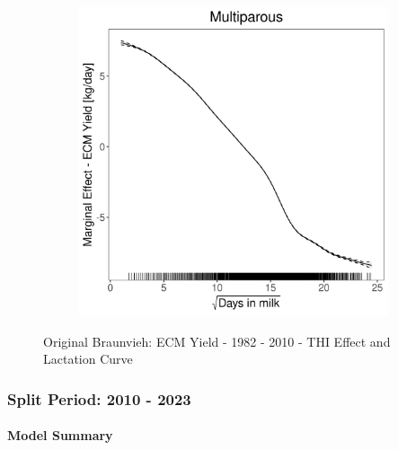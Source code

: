\begin{figure}[H]
\begin{subfigure}[b]{0.45\textwidth}
    \end{subfigure}
    \hspace{0.05\textwidth} %
    \begin{subfigure}[b]{0.45\textwidth}
        \centering
        \includegraphics[width=\textwidth]{thesis/figures/models/ecm/before2010/ob_ecm_before2010/ob_ecm_before2010_marginal_dim_milk_multi.png}
    \end{subfigure}
    \caption[]{Original Braunvieh: ECM Yield - 1982 - 2010 - THI Effect and Lactation Curve}
    \label{fig:main}
\end{figure}

\subsubsection{Split Period: 2010 - 2023}\label{model:ob_ecm_after}

\paragraph{Model Summary} \quad \\


